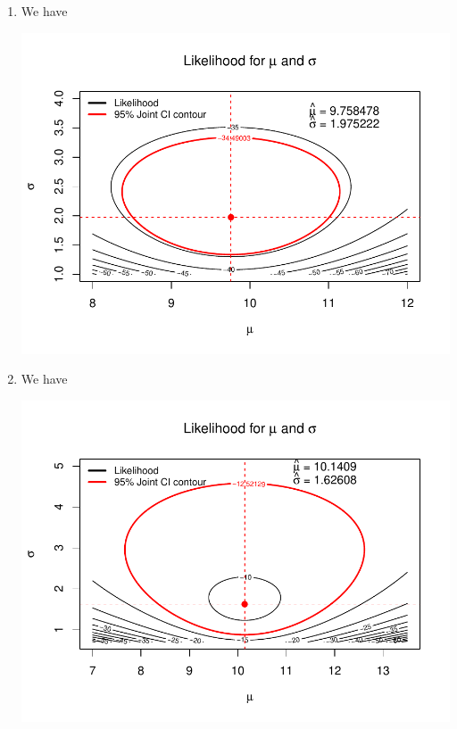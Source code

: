 \documentclass[12pt]{article}\usepackage[]{graphicx}\usepackage[]{color}
\makeatletter
\def\maxwidth{ %
  \ifdim\Gin@nat@width>\linewidth
    \linewidth
  \else
    \Gin@nat@width
  \fi
}
\newenvironment{knitrout}{}{} %
\makeatother
\begin{document}
\begin{enumerate}
\begin{enumerate}[label = (\alph*)]
\begin{knitrout}
{}



\end{knitrout}
\item We have
\begin{knitrout}
\color{fgcolor}

{\centering \includegraphics[width=\maxwidth]{figure/plot10c-1} 

}



\end{knitrout}
\item We have
\begin{knitrout}
\color{fgcolor}

{\centering \includegraphics[width=\maxwidth]{figure/plot10d-1} 

}
\end{knitrout}
\end{enumerate}
\end{enumerate}
\end{document}
